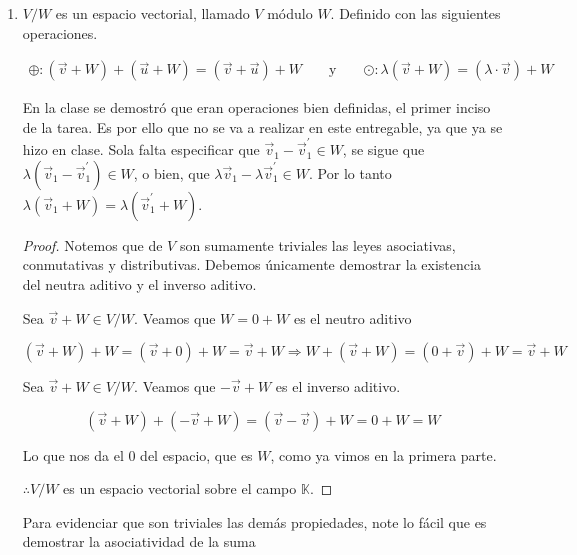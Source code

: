 \documentclass[12pt]{article}
\newcommand\K{\ensuremath{\mathbb{K}}}
\begin{document}
\begin{enumerate} 

\item $V / W$ es un espacio vectorial, llamado $V$ módulo $W$. Definido con las siguientes operaciones.

\begin{align*}
    \oplus : ( \vec{v} + W ) + ( \vec{u} + W ) = ( \vec{v} + \vec{u} ) + W  && \text{ y } && \odot : \lambda(\vec{v}+W)= (\lambda \cdot \vec{v}) +W
\end{align*}

\begin{remark}
    En la clase se demostró que eran operaciones bien definidas, el primer inciso de la tarea. Es por ello que no se va a realizar en este entregable, ya que ya se hizo en clase. Sola falta especificar que \(\vec{v}_1-\vec{v}_1^\prime \in W\), se sigue que \(\lambda(\vec{v}_1-\vec{v}_1^\prime)\in W\), o bien, que \(\lambda\vec{v}_1-\lambda\vec{v}_1^\prime \in W\). Por lo tanto \(\lambda(\vec{v}_1+W)=\lambda(\vec{v}_1^\prime+W)\). 
\end{remark}

\begin{proof}
    Notemos que de $V$ son sumamente triviales las leyes asociativas, conmutativas y distributivas. Debemos únicamente demostrar la existencia del neutra aditivo y el inverso aditivo.

    Sea $\vec{v} + W \in V / W$. Veamos que $W = 0 +W$ es el neutro aditivo

    \begin{equation*}
        (\vec{v} + W) + W = (\vec{v} + 0) + W = \vec{v} + W \Rightarrow W + (\vec{v} + W) = (0 + \vec{v}) + W = \vec{v} + W
    \end{equation*}

    Sea $\vec{v} + W \in V / W$. Veamos que $-\vec{v} + W$ es el inverso aditivo. 
        
    \begin{equation*}
        (\vec{v} + W) + (-\vec{v} + W) = (\vec{v} - \vec{v}) + W = 0 + W = W
    \end{equation*}

    Lo que nos da el 0 del espacio, que es $W$, como ya vimos en la primera parte. 

    $\therefore V / W$ es un espacio vectorial sobre el campo $\K$. 
\end{proof}

\begin{remark}
    Para evidenciar que son triviales las demás propiedades, note lo fácil que es demostrar la asociatividad de la suma


\end{remark}
\end{enumerate}
\end{document}
